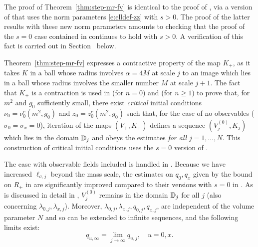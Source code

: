 The proof of Theorem~\ref{thm:step-mr-fv} is identical to the proof of
\cite[Theorem~\ref{phi4-thm:step-mr-fv}]{ST-phi4}, via a version of
\cite[Theorems~\ref{step-thm:mr-R}--\ref{step-thm:mr}]{BS-rg-step} that
uses the norm parameters \eqref{e:elldef-zz} with $s > 0$.
The proof of the latter results with these new norm parameters amounts to
checking that the proof of the $s = 0$ case contained in \cite{BS-rg-IE,BS-rg-step}
continues to hold with $s > 0$. A verification of this fact is carried
out in Section~\REF %
below.

Theorem~\ref{thm:step-mr-fv} expresses a contractive property of the map $K_+$,
as it takes $K$ in a ball whose radius involves $\alpha=4M$ at scale $j$ to
an image which lies in a ball whose radius involves the smaller number $M$ at scale
$j+1$.  The fact that $K_+$ is a contraction is used
in \cite[Proposition~\ref{log-prop:KjNbd}]{BBS-saw4-log} (for $n=0$) and
\cite[Theorem~\ref{phi4-log-thm:flow-flow}]{BBS-phi4-log}
(for $n \ge 1$) to prove that, for $m^2$ and
$g_0$ sufficiently small, there exist \emph{critical} initial conditions
$\nu_0 = \nu_0^c(m^2, g_0)$ and $z_0 = z_0^c(m^2, g_0)$ such that,
for the case of no observables ($\sigma_0=\sigma_x=0$), iteration of
the maps $(V_+,K_+)$ defines a
sequence $(V_j^{(0)}, K_j)$ which lies
in the domain $\mathbb{D}_j$ and obeys the estimates 
\emph{for all} $j = 1, \ldots, N$.
This construction of critical initial conditions uses the $s=0$ version
of .

The case with observable fields included is handled in \cite{ST-phi4}.
Because we have increased $\ell_{\sigma,j}$ beyond the mass scale, the
estimates on $q_0,q_x$ given by the bound on $R_+$ in  are
significantly improved compared to their versions with $s=0$ in \cite{ST-phi4}.
As is discussed in detail in  \cite[Section~\ref{phi4-sec:pfmr1}]{ST-phi4},
$V_j^{(0)}$ remains in the domain $\mathbb{D}_j$ for all $j$
(also concerning $\lambda_{0,j}, \lambda_{x,j}$).
Moreover,
$\lambda_{0,j}, \lambda_{x,j},q_{0,j},q_{x,j}$, are independent of the volume parameter $N$ and
so can be extended to infinite sequences, and the following limits exist:
\begin{equation}
q_{u,\infty} = \lim_{j\to\infty} q_{u,j}, \quad u = 0, x.
\end{equation}


